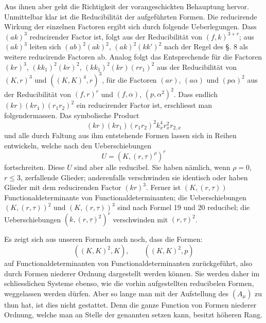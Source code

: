 \documentclass[10pt]{article}
\begin{document}
Aus ihnen aber geht die Richtigkeit der vorangeschickten Behauptung hervor. Unmittelbar klar ist die Reducibilität der aufgeführten Formen. Die reducirende Wirkung der einzelnen Factoren ergibt sich durch folgende Ueberlegungen. Dass $(ak)^3$ reducirender Factor ist, folgt aus der Reducibilität von $(f,k)^{3+r}$; aus $(ak)^3$ leiten sich $(ab)^2(ak)^2$, $(ak)^2(kk')^2$ nach der Regel des §. 8 als weitere reducirende Factoren ab. Analog folgt das Entsprechende für die Factoren $(kr)^3$, $(kk_1)^2(kr)^2$, $(kk_1)^2(kr)(rr_1)^2$ aus der Reducibilität von $(K,r)^3$ und $((K,K)^4,r)^3$, für die Factoren $(ar)$, $(a\alpha)$ und $(p\alpha)^2$ aus der Reducibilität von $(f,r)^r$ und $(f,\alpha)$, $(p,\alpha^2)^2$. Dass endlich $(kr)(kr_1)(r_1r_2)^2$ ein reducirender Factor ist, erschliesst man folgendermassen. Das symbolische Product
\[
(kr)(kr_1)(r_1r_2)^2k_x^4r_x^2r_{2,x}
\]
und alle durch Faltung aus ihm entstehende Formen lassen sich in Reihen entwickeln, welche nach den Ueberschiebungen
\[
U=(K,(r,\tau)^\rho)^r
\]
fortschreiten. Diese $U$ sind aber alle reducibel. Sie haben nämlich, wenn $\rho=0$, $r\leq 3$, zerfallende Glieder; anderenfalls verschwinden sie identisch oder haben Glieder mit dem reducirenden Factor $(kr)^3$. Ferner ist $(K,(r,\tau))$ Functionaldeterminante von Functionaldeterminanten; die Ueberschiebungen $(K,(r,\tau))^2$ und $(K,(r,\tau))^3$ sind nach Formel 19 und 20 reducibel; die Ueberschiebungen $(k,(r,\tau)^2)^r$ verschwinden mit $(r,\tau)^2$.

Es zeigt sich aus unseren Formeln auch noch, dass die Formen:
\[
((K,K)^2,K),
\qquad ((K,K)^2,p)
\]
auf Functionaldeterminanten von Functionaldeterminanten zurückgeführt, also durch Formen niederer Ordnung dargestellt werden können. Sie werden daher im schliesslichen Systeme ebenso, wie die vorhin aufgestellten reducibelen Formen, weggelassen werden dürfen. Aber so lange man mit der Aufstellung des $(A_\mu)$ zu thun hat, ist dies nicht gestattet. Denn die ganze Function von Formen niederer Ordnung, welche man an Stelle der genannten setzen kann, besitzt höheren Rang.
\end{document}
